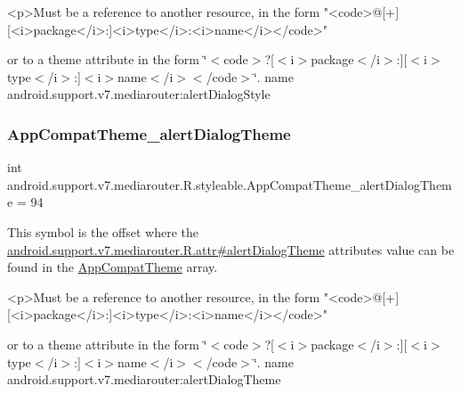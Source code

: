 \begin{DoxyVerb}      <p>Must be a reference to another resource, in the form "<code>@[+][<i>package</i>:]<i>type</i>:<i>name</i></code>"
\end{DoxyVerb}
 or to a theme attribute in the form \char`\"{}$<$code$>$?\mbox{[}$<$i$>$package$<$/i$>$\+:\mbox{]}\mbox{[}$<$i$>$type$<$/i$>$\+:\mbox{]}$<$i$>$name$<$/i$>$$<$/code$>$\char`\"{}.  name android.\+support.\+v7.\+mediarouter\+:alert\+Dialog\+Style \mbox{\label{classandroid_1_1support_1_1v7_1_1mediarouter_1_1R_1_1styleable_a2053a143324d9fce095f3e158a2ec295}} 
\subsubsection{\texorpdfstring{App\+Compat\+Theme\+\_\+alert\+Dialog\+Theme}{AppCompatTheme\_alertDialogTheme}}
{\footnotesize\ttfamily int android.\+support.\+v7.\+mediarouter.\+R.\+styleable.\+App\+Compat\+Theme\+\_\+alert\+Dialog\+Theme = 94\hspace{0.3cm}{\ttfamily [static]}}

This symbol is the offset where the \hyperlink{classandroid_1_1support_1_1v7_1_1mediarouter_1_1R_1_1attr_a49593043ae68ed908857aac991efa4fe}{android.\+support.\+v7.\+mediarouter.\+R.\+attr\#alert\+Dialog\+Theme} attribute\textquotesingle{}s value can be found in the \hyperlink{classandroid_1_1support_1_1v7_1_1mediarouter_1_1R_1_1styleable_a4e3d3900c75d49aeb2f283cac00214d6}{App\+Compat\+Theme} array.

\begin{DoxyVerb}      <p>Must be a reference to another resource, in the form "<code>@[+][<i>package</i>:]<i>type</i>:<i>name</i></code>"
\end{DoxyVerb}
 or to a theme attribute in the form \char`\"{}$<$code$>$?\mbox{[}$<$i$>$package$<$/i$>$\+:\mbox{]}\mbox{[}$<$i$>$type$<$/i$>$\+:\mbox{]}$<$i$>$name$<$/i$>$$<$/code$>$\char`\"{}.  name android.\+support.\+v7.\+mediarouter\+:alert\+Dialog\+Theme \mbox{\label{classandroid_1_1support_1_1v7_1_1mediarouter_1_1R_1_1styleable_a09c1f30862ae9d1ce8431309e49a7d43}} 
